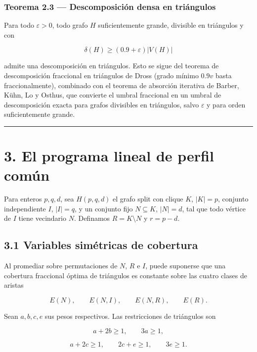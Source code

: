 \documentclass[
  11pt,
]{article}
\begin{document}
\subsubsection{Teorema 2.3 --- Descomposición densa en triángulos}\label{teorema-2.3-descomposiciuxf3n-densa-en-triuxe1ngulos}

Para todo \(\varepsilon>0\), todo grafo \(H\) suficientemente grande, divisible en triángulos y con

\[
\delta(H)\ge(0.9+\varepsilon)|V(H)|
\]

admite una descomposición en triángulos. Esto se sigue del teorema de descomposición fraccional en triángulos de Dross (grado mínimo \(0.9v\) basta fraccionalmente), combinado con el teorema de absorción iterativa de Barber, Kühn, Lo y Osthus, que convierte el umbral fraccional en un umbral de descomposición exacta para grafos divisibles en triángulos, salvo \(\varepsilon\) y para orden suficientemente grande.

\begin{center}\rule{0.5\linewidth}{0.5pt}\end{center}

\section{3. El programa lineal de perfil común}\label{el-programa-lineal-de-perfil-comuxfan}

Para enteros \(p,q,d\), sea \(H(p,q,d)\) el grafo split con clique \(K\), \(|K|=p\), conjunto independiente \(I\), \(|I|=q\), y un conjunto fijo \(N\subseteq K\), \(|N|=d\), tal que todo vértice de \(I\) tiene vecindario \(N\). Definamos \(R=K\setminus N\) y \(r=p-d\).

\subsection{3.1 Variables simétricas de cobertura}\label{variables-simuxe9tricas-de-cobertura}

Al promediar sobre permutaciones de \(N\), \(R\) e \(I\), puede suponerse que una cobertura fraccional óptima de triángulos es constante sobre las cuatro clases de aristas

\[
E(N),
\qquad E(N,I),
\qquad E(N,R),
\qquad E(R).
\]

Sean \(a,b,c,e\) sus pesos respectivos. Las restricciones de triángulos son

\[
a+2b\ge1,
\qquad
3a\ge1,
\tag{3.1}
\]

\[
a+2c\ge1,
\qquad
2c+e\ge1,
\qquad
3e\ge1.
\tag{3.2}
\]
\end{document}
